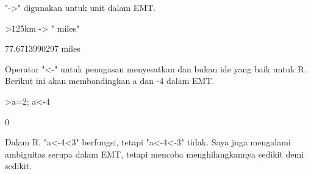 \documentclass[a4paper,10pt]{article}
\begin{document}
\begin{eulernotebook}
\begin{eulercomment}
\begin{eulercomment}
\begin{eulercomment}
\begin{eulercomment}
\begin{eulercomment}
\begin{eulercomment}
\begin{eulercomment}
\begin{eulercomment}
\begin{eulercomment}
\begin{eulercomment}
\begin{eulercomment}
\begin{eulercomment}
\begin{eulercomment}
\begin{eulercomment}
\begin{eulercomment}
\begin{eulercomment}
\begin{eulercomment}
\begin{eulercomment}
\begin{eulercomment}
\begin{eulercomment}
\begin{eulercomment}
\begin{eulercomment}
\begin{eulercomment}
\begin{eulercomment}
\begin{eulercomment}
\begin{eulercomment}
\begin{eulercomment}
\begin{eulercomment}
\begin{eulercomment}
\begin{eulercomment}
\begin{eulercomment}
\begin{eulercomment}
\begin{eulercomment}
\begin{eulercomment}
\begin{eulercomment}
"-\textgreater{}" digunakan untuk unit dalam EMT.
\end{eulercomment}
\begin{eulerprompt}
>125km -> " miles"
\end{eulerprompt}
\begin{euleroutput}
  77.6713990297 miles
\end{euleroutput}
\begin{eulercomment}
Operator "\textless{}-" untuk penugasan menyesatkan dan bukan ide yang baik
untuk R. Berikut ini akan membandingkan a dan -4 dalam EMT.
\end{eulercomment}
\begin{eulerprompt}
>a=2; a<-4
\end{eulerprompt}
\begin{euleroutput}
  0
\end{euleroutput}
\begin{eulercomment}
Dalam R, "a\textless{}-4\textless{}3" berfungsi, tetapi "a\textless{}-4\textless{}-3" tidak. Saya juga
mengalami ambiguitas serupa dalam EMT, tetapi mencoba menghilangkannya
sedikit demi sedikit.


\end{eulercomment}
\end{eulercomment}
\end{eulercomment}
\end{eulercomment}
\end{eulercomment}
\end{eulercomment}
\end{eulercomment}
\end{eulercomment}
\end{eulercomment}
\end{eulercomment}
\end{eulercomment}
\end{eulercomment}
\end{eulercomment}
\end{eulercomment}
\end{eulercomment}
\end{eulercomment}
\end{eulercomment}
\end{eulercomment}
\end{eulercomment}
\end{eulercomment}
\end{eulercomment}
\end{eulercomment}
\end{eulercomment}
\end{eulercomment}
\end{eulercomment}
\end{eulercomment}
\end{eulercomment}
\end{eulercomment}
\end{eulercomment}
\end{eulercomment}
\end{eulercomment}
\end{eulercomment}
\end{eulercomment}
\end{eulercomment}
\end{eulercomment}
\end{eulernotebook}
\end{document}
